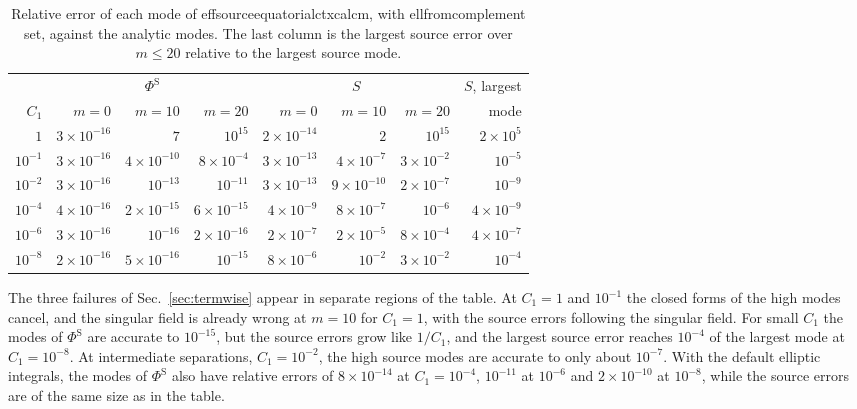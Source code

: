 \documentclass[11pt]{article}
\newcommand{\PhiS}{\Phi^{\mathrm{S}}}
\newcommand{\codeus}{\textunderscore\allowbreak}
\newcommand{\codehy}{-\allowbreak}
\newcommand{\code}[1]{{\ttfamily\let\_\codeus\let\-\codehy #1}}
\begin{document}
\begin{table}[H]
  \centering
  \caption{Relative error of each mode of \code{effsource\_equatorial\_ctx\_calc\_m},
    with \code{ell\_from\_complement} set, against the analytic modes. The last
    column is the largest source error over $m\le20$ relative to the largest
    source mode.}
  \label{tab:old}
  \begin{tabular}{rrrrrrrr}
    \toprule
    & \multicolumn{3}{c}{$\PhiS$} & \multicolumn{3}{c}{$S$} & $S$, largest \\
    \cmidrule(lr){2-4}\cmidrule(lr){5-7}
    $C_1$ & $m=0$ & $m=10$ & $m=20$ & $m=0$ & $m=10$ & $m=20$ & mode \\
    \midrule
    $1$       & $3\times10^{-16}$ & $7$                 & $10^{15}$           & $2\times10^{-14}$ & $2$                 & $10^{15}$          & $2\times10^{5}$ \\
    $10^{-1}$ & $3\times10^{-16}$ & $4\times10^{-10}$   & $8\times10^{-4}$    & $3\times10^{-13}$ & $4\times10^{-7}$    & $3\times10^{-2}$   & $10^{-5}$ \\
    $10^{-2}$ & $3\times10^{-16}$ & $10^{-13}$          & $10^{-11}$          & $3\times10^{-13}$ & $9\times10^{-10}$   & $2\times10^{-7}$   & $10^{-9}$ \\
    $10^{-4}$ & $4\times10^{-16}$ & $2\times10^{-15}$   & $6\times10^{-15}$   & $4\times10^{-9}$  & $8\times10^{-7}$    & $10^{-6}$          & $4\times10^{-9}$ \\
    $10^{-6}$ & $3\times10^{-16}$ & $10^{-16}$          & $2\times10^{-16}$   & $2\times10^{-7}$  & $2\times10^{-5}$    & $8\times10^{-4}$   & $4\times10^{-7}$ \\
    $10^{-8}$ & $2\times10^{-16}$ & $5\times10^{-16}$   & $10^{-15}$          & $8\times10^{-6}$  & $10^{-2}$           & $3\times10^{-2}$   & $10^{-4}$ \\
    \bottomrule
  \end{tabular}
\end{table}

The three failures of Sec.~\ref{sec:termwise} appear in separate regions of
the table. At $C_1=1$ and $10^{-1}$ the closed forms of the high modes cancel,
and the singular field is already wrong at $m=10$ for $C_1=1$, with the source
errors following the singular field. For small $C_1$ the modes of $\PhiS$ are
accurate to $10^{-15}$, but the source errors grow like $1/C_1$, and the
largest source error reaches $10^{-4}$ of the largest mode at $C_1=10^{-8}$. At
intermediate separations, $C_1=10^{-2}$, the high source modes are accurate to
only about $10^{-7}$. With the default elliptic integrals, the modes of $\PhiS$
also have relative errors of $8\times10^{-14}$ at $C_1=10^{-4}$,
$10^{-11}$ at $10^{-6}$ and $2\times10^{-10}$ at $10^{-8}$, while the source
errors are of the same size as in the table.
\end{document}
